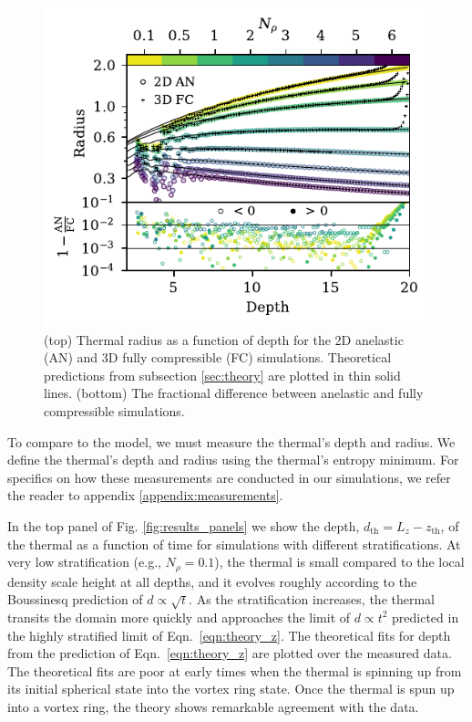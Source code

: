 \begin{figure}[p!]
    \includegraphics[width=\columnwidth]{./figs/diff_AN_FC.pdf}
    \caption[Comparison of low Mach number Fully Compressible and Anelastic thermal results.]
	{
	(top) Thermal radius as a function of depth for the 2D anelastic (AN) and 3D fully compressible (FC) simulations.
	Theoretical predictions from subsection \ref{sec:theory} are plotted in thin solid lines.
	(bottom) The fractional difference between anelastic and fully compressible simulations.
    \label{fig:diff} }
\end{figure}

To compare to the model, we must measure the thermal's depth and radius.
We define the thermal's depth and radius using the thermal's entropy minimum.
For specifics on how these measurements are conducted in our simulations, we refer the reader to appendix \ref{appendix:measurements}.

In the top panel of Fig. \ref{fig:results_panels} we show the depth, $d_{\text{th}} = L_z - z_{\text{th}}$, of the thermal as a function of time for simulations with different stratifications. 
At very low stratification (e.g., $N_\rho = 0.1$), the thermal is small compared to the local density scale height at all depths, and it evolves roughly according to the Boussinesq prediction of $d \propto \sqrt{t}$. 
As the stratification increases, the thermal transits the domain more quickly and approaches the limit of $d \propto t^2$ predicted in the highly stratified limit of Eqn.~\ref{eqn:theory_z}. 
The theoretical fits for depth from the prediction of Eqn.~\ref{eqn:theory_z} are plotted over the measured data.
The theoretical fits are poor at early times when the thermal is spinning up from its initial spherical state into the vortex ring state.
Once the thermal is spun up into a vortex ring, the theory shows remarkable agreement with the data.

